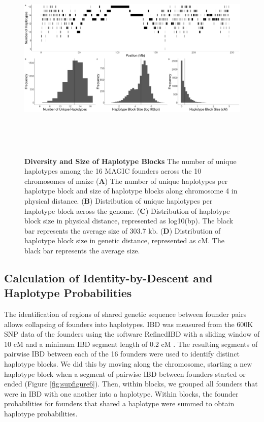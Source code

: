 \documentclass[9pt,twocolumn,twoside]{gsag3jnl}
\begin{document}
\begin{figure}[ht]
\includegraphics[width=\textwidth,height=10cm]{figures/figure2.png}
\caption{\textbf{Diversity and Size of Haplotype Blocks} The number of unique haplotypes among the 16 MAGIC founders across the 10 chromosomes of maize (\textbf{A}) The number of unique haplotypes per haplotype block and size of haplotype blocks along chromosome 4 in physical distance. (\textbf{B}) Distribution of unique haplotypes per haplotype block across the genome. (\textbf{C}) Distribution of haplotype block size in physical distance, represented as log10(bp). The black bar represents the average size of 303.7 kb. (\textbf{D}) Distribution of haplotype block size in genetic distance, represented as cM. The black bar represents the average size.}
\label{fig:figure2}
\end{figure}

\subsection{Calculation of Identity-by-Descent and Haplotype Probabilities}
The identification of regions of shared genetic sequence between founder pairs allows collapsing of founders into haplotypes.
IBD was measured from the 600K SNP data of the founders using the software RefinedIBD with a sliding window of 10 cM and a minimum IBD segment length of 0.2 cM \citep{Browning}.
The resulting segments of pairwise IBD between each of the 16 founders were used to identify distinct haplotype blocks.
We did this by moving along the chromosome, starting a new haplotype block when a segment of pairwise IBD between founders started or ended (Figure \ref{fig:supfigure6}).
Then, within blocks, we grouped all founders that were in IBD with one another into a haplotype.
Within blocks, the founder probabilities for founders that shared a haplotype were summed to obtain haplotype probabilities.
\end{document}

